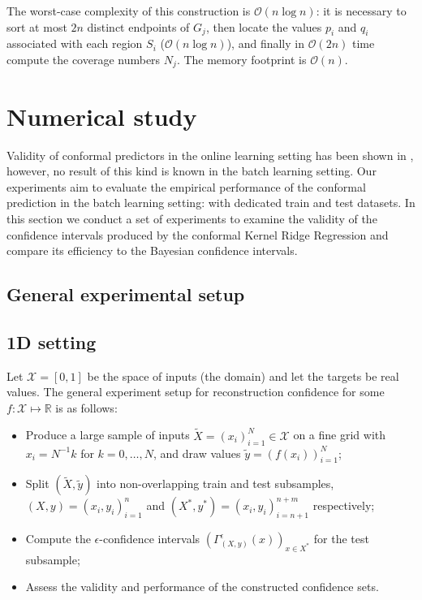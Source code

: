 \documentclass[a4paper]{article}
\newcommand{\Xcal}{\mathcal{X}}
\newcommand{\Real}{\mathbb{R}}
\begin{document}
The worst-case complexity of this construction is $\mathcal{O}(n \log n)$: it is
necessary to sort at most $2n$ distinct endpoints of $G_j$, then locate the values
$p_i$ and $q_i$ associated with each region $S_i$ ($\mathcal{O}(n\log n)$), and
finally in $\mathcal{O}(2n)$ time compute the coverage numbers $N_j$. The memory
footprint is $\mathcal{O}(n)$.



\section{Numerical study} %
\label{sec:numerical_study}

Validity of conformal predictors in the online learning setting has been shown in
\cite{vovk2005}, however, no result of this kind is known in the batch learning setting.
Our experiments aim to evaluate the empirical performance of the conformal prediction
in the batch learning setting: with dedicated train and test datasets. In this section
we conduct a set of experiments to examine the validity of the confidence intervals
produced by the conformal Kernel Ridge Regression and compare its efficiency to
the Bayesian confidence intervals.

\subsection{General experimental setup} %
\label{sub:general_experimental_setup}


\subsection{1D setting} %
\label{sub:1d_setting}

Let $\Xcal =[0,1]$ be the space of inputs (the domain) and let the targets be real
values. The general experiment setup for reconstruction confidence for some
$f:\Xcal\mapsto\Real$ is as follows:
\begin{itemize}
    \item Produce a large sample of inputs $\tilde{X} = (x_i)_{i=1}^N\in \Xcal$
    on a fine grid with $x_i = N^{-1} k$ for $k=0, \ldots, N$, and draw values
    $\tilde{y}=(f(x_i))_{i=1}^N$;
    \item Split $(\tilde{X}, \tilde{y})$ into non-overlapping train and test subsamples,
    $(X, y) = (x_i, y_i)_{i=1}^n$ and $(X^*, y^*) = (x_i, y_i)_{i=n+1}^{n+m}$ respectively;
    \item Compute the $\epsilon$-confidence intervals $(\Gamma^\epsilon_{(X, y)}(x))_{x\in X^*}$
    for the test subsample;
    \item Assess the validity and performance of the constructed confidence sets.
\end{itemize}
\end{document}

